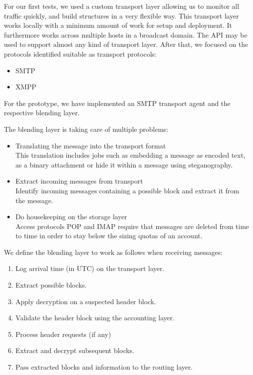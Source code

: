 \documentclass[10pt,journal,compsoc]{IEEEtran}
\begin{document}
For our first tests, we used a custom transport layer allowing us to monitor all traffic quickly, and build structures in a very flexible way. This transport layer works locally with a minimum amount of work for setup and deployment. It furthermore works across multiple hosts in a broadcast domain. The API may be used to support almost any kind of transport layer. After that, we focused on the protocols identified suitable as transport protocols:
\begin{itemize}
	\item SMTP
	\item XMPP
\end{itemize}
For the prototype, we have implemented an SMTP transport agent and the respective blending layer.

The blending layer is taking care of multiple problems:
\begin{itemize}
	\item Translating the message into the transport format\\
	This translation includes jobs such as embedding a message as encoded text, as a binary attachment or hide it within a message using steganography.
	\item Extract incoming messages from transport\\
	Identify incoming messages containing a possible block and extract it from the message.
	\item Do housekeeping on the storage layer\\
	Access protocols POP and IMAP require that messages are deleted from time to time in order to stay below the sizing quotas of an account.      
\end{itemize}

We define the blending layer to work as follows when receiving messages:
\begin{enumerate}
	\item Log arrival time (in UTC) on the transport layer.
	\item Extract possible blocks.
	\item Apply decryption on a suspected header block.
	\item Validate the header block using the accounting layer.
	\item Process header requests (if any)
	\item Extract and decrypt subsequent blocks.
	\item Pass extracted blocks and information to the routing layer.
\end{enumerate}
\end{document}
